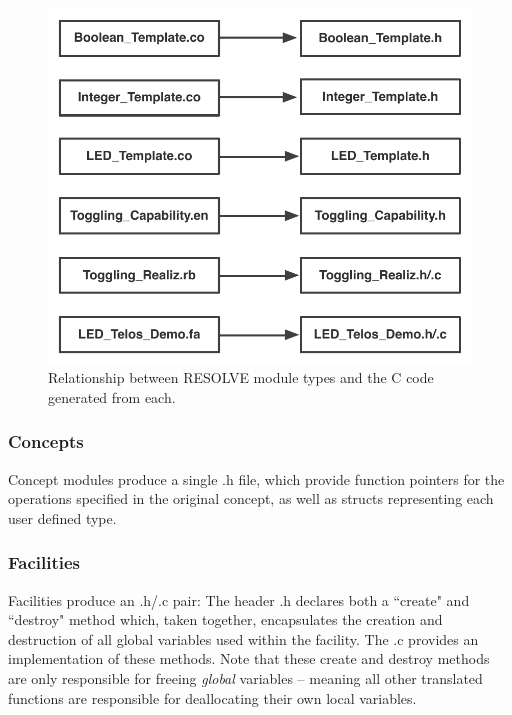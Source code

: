 \begin{figure}
\begin{center}
\includegraphics[scale=.60]{figs/relationship.pdf}
\end{center}
\caption{Relationship between RESOLVE module types and the C code generated from each.}
\label{fig:relationship}
\end{figure}

\subsubsection{Concepts}
\label{sec:conceptoverview}
Concept modules produce a single .h file, which provide function pointers for the operations specified in the original concept, as well as structs representing each user defined type. 

\subsubsection{Facilities}
\label{sec:facilitiesoverview}
Facilities produce an .h/.c pair: The header .h declares both a ``create" and ``destroy" method which, taken together, encapsulates the creation and destruction of all global variables used within the facility. The .c provides an implementation of these methods.  Note that these create and destroy methods are only responsible for freeing \textit{global} variables -- meaning all other translated functions are responsible for deallocating their own local variables. 

